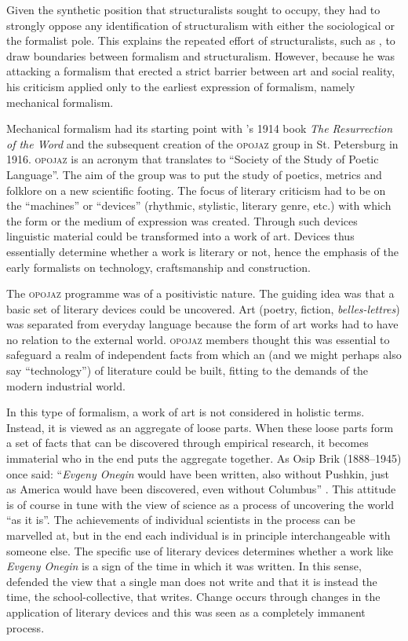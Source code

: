 \documentclass[output=paper]{langscibook}
\begin{document}
Given the synthetic position that structuralists sought to occupy, they had to strongly oppose any identification of structuralism with either the sociological or the formalist pole. This explains the repeated effort of structuralists, such as {\Mukarovsky}, to draw boundaries between formalism and structuralism. However, because he was attacking a formalism that erected a strict barrier between art and social reality, his criticism applied only to the earliest expression of formalism, namely mechanical formalism.

Mechanical formalism had its starting point with {\Shklovsky}'s 1914 book \emph{The Resurrection of the Word} and the subsequent creation of the \textsc{opojaz} group in St. Petersburg in 1916. \textsc{opojaz} is an acronym that translates to ``Society of the Study of Poetic Language''. The aim of the group was to put the study of poetics, metrics and folklore on a new scientific footing. The focus of literary criticism had to be on the ``machines'' or ``devices'' (rhythmic, stylistic, literary genre, etc.) with which the form or the medium of expression was created. Through such devices linguistic material could be transformed into a work of art. Devices thus essentially determine whether a work is literary or not, hence the emphasis of the early formalists on technology, craftsmanship and construction.

\largerpage[-1]
The \textsc{opojaz} programme was of a positivistic nature. The guiding idea was that a basic set of literary devices could be uncovered. Art (poetry, fiction, \emph{belles-lettres}) was separated from everyday language because the form of art works had to have no relation to the external world. \textsc{opojaz} members thought this was essential to safeguard a realm of independent facts from which an  (and we might perhaps also say ``technology'') of literature could be built, fitting to the demands of the modern industrial world.

In this type of formalism, a work of art is not considered in holistic terms. Instead, it is viewed as an aggregate of loose parts. When these loose parts form a set of facts that can be discovered through empirical research, it becomes immaterial who in the end puts the aggregate together. As Osip Brik (1888--1945) once said: ``\emph{Evgeny Onegin} would have been written, also without Pushkin, just as America would have been discovered, even without Columbus'' \citep[213]{Brik1923}. This attitude is of course in tune with the view of science as a process of uncovering the world ``as it is''. The achievements of individual scientists in the process can be marvelled at, but in the end each individual is in principle interchangeable with someone else. The specific use of literary devices determines whether a work like \emph{Evgeny Onegin} is a sign of the time in which it was written. In this sense, {\Shklovsky} defended the view that a single man does not write and that it is instead the time, the school-collective, that writes. Change occurs through changes in the application of literary devices and this was seen as a completely immanent process.
\end{document}
